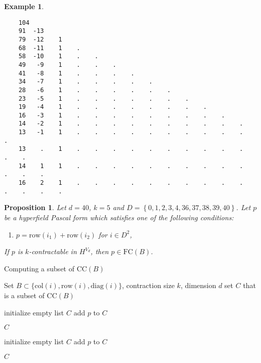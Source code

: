 \documentclass[11pt]{article}
\newtheorem{proposition}[theorem]{Proposition}
\newtheorem{example}[theorem]{Example}
\begin{document}
\begin{example}
  \begingroup
  \fontsize{8pt}{10pt}\selectfont
  \begin{verbatim}
    104 
    91  -13 
    79  -12    1 
    68  -11    1    . 
    58  -10    1    .    . 
    49   -9    1    .    .    . 
    41   -8    1    .    .    .    . 
    34   -7    1    .    .    .    .    . 
    28   -6    1    .    .    .    .    .    . 
    23   -5    1    .    .    .    .    .    .    . 
    19   -4    1    .    .    .    .    .    .    .    . 
    16   -3    1    .    .    .    .    .    .    .    .    . 
    14   -2    1    .    .    .    .    .    .    .    .    .    . 
    13   -1    1    .    .    .    .    .    .    .    .    .    .    . 
    13    .    1    .    .    .    .    .    .    .    .    .    .    .    . 
    14    1    1    .    .    .    .    .    .    .    .    .    .    .    .    . 
    16    2    1    .    .    .    .    .    .    .    .    .    .    .    .    .    .  
  \end{verbatim}
  \endgroup
\end{example}

\begin{proposition}
  Let \( d = 40 \), \( k = 5 \) and \( D = \left\{ 0, 1, 2, 3, 4, 36, 37, 38, 39,40 \right\} \).
  Let \( p \) be a hyperfield Pascal form which satisfies one of the following conditions:
  \begin{enumerate}
    \item \( p = \mathrm{row}(i_1) + \mathrm{row}(i_2) \) for \( i \in D^2 \),
  \end{enumerate}
  If \( p \) is \( k \)-contractable in \( H^{V_d} \), then \( p \in \mathrm{FC}(B) \). 
\end{proposition}


\begin{algorithm}
\caption{Computing a subset of \(\mathrm{CC}(B) \)}
  \begin{algorithmic}[1]
    \Require Set $B \subset \{ \mathrm{col}(i), \mathrm{row}(i), \mathrm{diag}(i) \}$, contraction size $k$, dimension $d$
    \Ensure set $C$ that is a subset of $\mathrm{CC}(B)$ 

    \State initialize empty list \( C \)
      \State add $p$ to \( C \)
      \EndIf
    \EndIf
    \EndFor

    \State \Return \( C \)
    \EndFunction

    \State

    \State initialize empty list \( C \)
      \State add $p$ to \( C \)
      \EndIf
    \EndIf
    \EndFor

    \State \Return \( C \)
    \EndFunction
  \end{algorithmic}  
\end{algorithm}
\end{document}
